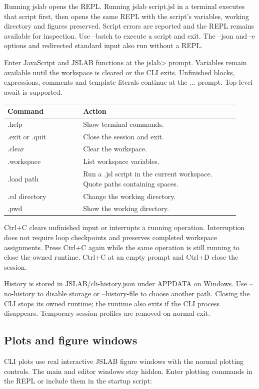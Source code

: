 \documentclass[12pt,a4paper]{article}
\begin{document}
Running jslab opens the REPL. Running jslab script.jsl in a terminal executes that script first, then opens the same REPL with the script's variables, working directory and figures preserved. Script errors are reported and the REPL remains available for inspection. Use --batch to execute a script and exit. The --json and -e options and redirected standard input also run without a REPL.

Enter JavaScript and JSLAB functions at the jslab> prompt. Variables remain available until the workspace is cleared or the CLI exits. Unfinished blocks, expressions, comments and template literals continue at the ... prompt. Top-level await is supported.

\begin{longtable}{p{0.30\linewidth}p{0.62\linewidth}}
\hline
Command & Action \\
\hline
.help & Show terminal commands. \\
.exit or .quit & Close the session and exit. \\
.clear & Clear the workspace. \\
.workspace & List workspace variables. \\
.load path & Run a .jsl script in the current workspace. Quote paths containing spaces. \\
.cd directory & Change the working directory. \\
.pwd & Show the working directory. \\
\hline
\end{longtable}
Ctrl+C clears unfinished input or interrupts a running operation. Interruption does not require loop checkpoints and preserves completed workspace assignments. Press Ctrl+C again while the same operation is still running to close the owned runtime. Ctrl+C at an empty prompt and Ctrl+D close the session.

History is stored in JSLAB/cli-history.json under APPDATA on Windows. Use --no-history to disable storage or --history-file to choose another path. Closing the CLI stops its owned runtime; the runtime also exits if the CLI process disappears. Temporary session profiles are removed on normal exit.


\subsection{Plots and figure windows}

CLI plots use real interactive JSLAB figure windows with the normal plotting controls. The main and editor windows stay hidden. Enter plotting commands in the REPL or include them in the startup script:
\end{document}
